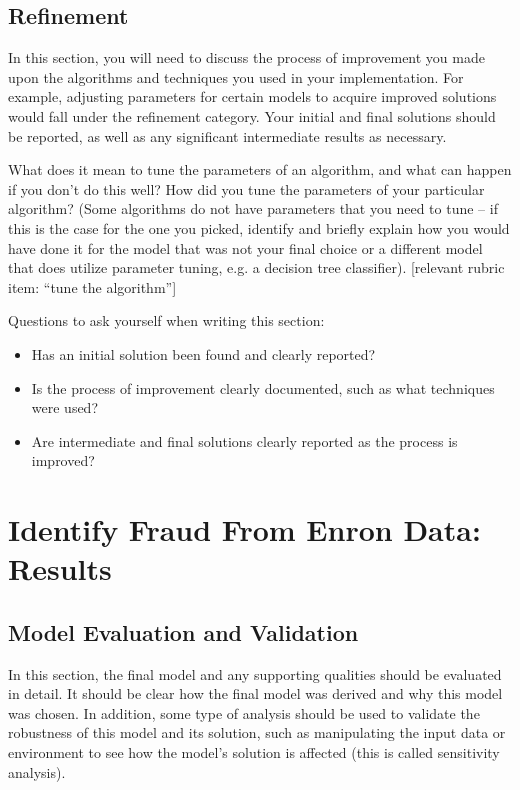 \documentclass[twoside,openright,titlepage,numbers=noenddot,headinclude,%
               footinclude=true,cleardoublepage=empty,abstractoff,BCOR=5mm,%
               paper=a4,fontsize=11pt,ngerman,american]{scrreprt}
\numberwithin{theorem}{chapter}
\numberwithin{definition}{chapter}
\numberwithin{algorithm}{chapter}
\numberwithin{figure}{chapter}
\numberwithin{table}{chapter}
\numberwithin{equation}{chapter}
\begin{document}
\section*{Refinement}
In this section, you will need to discuss the process of improvement you made upon the algorithms and techniques you used in your implementation. For example, adjusting parameters for certain models to acquire improved solutions would fall under the refinement category. Your initial and final solutions should be reported, as well as any significant intermediate results as necessary. 

What does it mean to tune the parameters of an algorithm, and what can happen if you don't do this well?  How did you tune the parameters of your particular algorithm? (Some algorithms do not have parameters that you need to tune -- if this is the case for the one you picked, identify and briefly explain how you would have done it for the model that was not your final choice or a different model that does utilize parameter tuning, e.g. a decision tree classifier).  [relevant rubric item: ``tune the algorithm'']

Questions to ask yourself when writing this section:
\begin{itemize}%
\item Has an initial solution been found and clearly reported?
\item Is the process of improvement clearly documented, such as what techniques were used?
\item Are intermediate and final solutions clearly reported as the process is improved?
\end{itemize}

\chapter*{Identify Fraud From Enron Data: Results}


\section*{Model Evaluation and Validation}
In this section, the final model and any supporting qualities should be evaluated in detail. It should be clear how the final model was derived and why this model was chosen. In addition, some type of analysis should be used to validate the robustness of this model and its solution, such as manipulating the input data or environment to see how the model’s solution is affected (this is called sensitivity analysis). 
\end{document}
